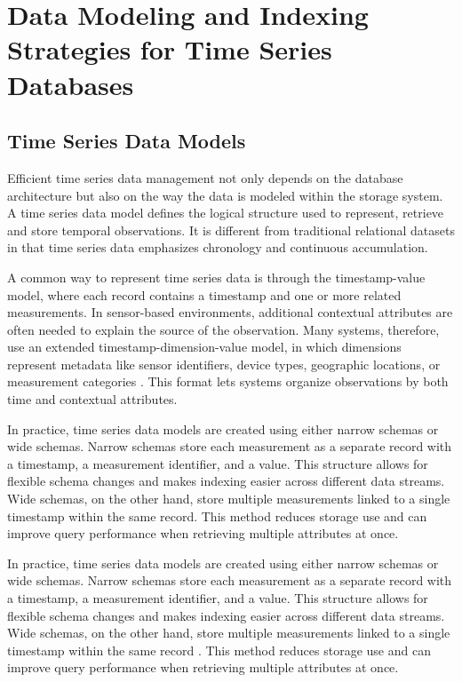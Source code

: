 \section{Data Modeling and Indexing Strategies for Time Series Databases}
\subsection{Time Series Data Models}
Efficient time series data management not only depends on the database architecture but also on the way the data is modeled within the storage system. A time series data model defines the logical structure used to represent, retrieve and store temporal observations. It is different from traditional relational datasets in that time series data emphasizes chronology and continuous accumulation. 

A common way to represent time series data is through the timestamp-value model, where each record contains a timestamp and one or more related measurements. In sensor-based environments, additional contextual attributes are often needed to explain the source of the observation. Many systems, therefore, use an extended timestamp-dimension-value model, in which dimensions represent metadata like sensor identifiers, device types, geographic locations, or measurement categories \cite{influxdb_key_concepts}. This format lets systems organize observations by both time and contextual attributes.

In practice, time series data models are created using either narrow schemas or wide schemas. Narrow schemas store each measurement as a separate record with a timestamp, a measurement identifier, and a value. This structure allows for flexible schema changes and makes indexing easier across different data streams. Wide schemas, on the other hand, store multiple measurements linked to a single timestamp within the same record. This method reduces storage use and can improve query performance when retrieving multiple attributes at once.


In practice, time series data models are created using either narrow schemas or wide schemas. Narrow schemas store each measurement as a separate record with a timestamp, a measurement identifier, and a value. This structure allows for flexible schema changes and makes indexing easier across different data streams. Wide schemas, on the other hand, store multiple measurements linked to a single timestamp within the same record \cite{timescale_narrow_wide}. This method reduces storage use and can improve query performance when retrieving multiple attributes at once.

